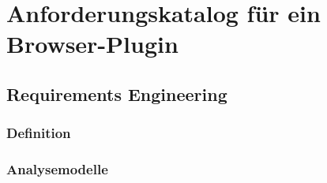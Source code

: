 \chapter{Anforderungskatalog für ein Browser-Plugin}
\label{chp:Anforderungskatalog}

\section{Requirements Engineering}
\label{sec:Anforderungskatalog:req}


\subsection{Definition}
\label{sec:Anforderungskatalog:req:definition}

\subsection{Analysemodelle}
\label{sec:Anforderungskatalog:req:modelle}%

